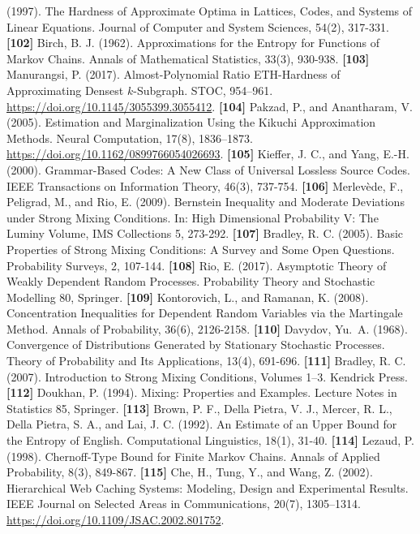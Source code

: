 \documentclass[
]{article}
\begin{document}
(1997). The Hardness of Approximate Optima in Lattices, Codes, and
Systems of Linear Equations. Journal of Computer and System Sciences,
54(2), 317-331.
\textbf{{[}102{]}} Birch, B. J. (1962). Approximations for the Entropy
for Functions of Markov Chains. Annals of Mathematical Statistics,
33(3), 930-938.
\textbf{{[}103{]}} Manurangsi, P.
(2017). Almost-Polynomial Ratio ETH-Hardness of Approximating Densest
$k$-Subgraph. STOC, 954--961. \url{https://doi.org/10.1145/3055399.3055412}.
\textbf{{[}104{]}} Pakzad, P., and Anantharam, V. (2005).
Estimation and Marginalization Using the Kikuchi Approximation Methods.
Neural Computation, 17(8), 1836--1873.
\url{https://doi.org/10.1162/0899766054026693}.
\textbf{{[}105{]}} Kieffer, J. C., and Yang, E.-H. (2000). Grammar-Based
Codes: A New Class of Universal Lossless Source Codes. IEEE Transactions
on Information Theory, 46(3), 737-754.
\textbf{{[}106{]}} Merlev\`ede, F., Peligrad, M., and Rio, E. (2009).
Bernstein Inequality and Moderate Deviations under Strong Mixing
Conditions. In: High Dimensional Probability V: The Luminy Volume,
IMS Collections 5, 273-292.
\textbf{{[}107{]}} Bradley, R. C. (2005). Basic Properties of Strong
Mixing Conditions: A Survey and Some Open Questions. Probability
Surveys, 2, 107-144.
\textbf{{[}108{]}} Rio, E. (2017). Asymptotic Theory of Weakly
Dependent Random Processes. Probability Theory and Stochastic
Modelling 80, Springer.
\textbf{{[}109{]}} Kontorovich, L., and Ramanan, K. (2008).
Concentration Inequalities for Dependent Random Variables via the
Martingale Method. Annals of Probability, 36(6), 2126-2158.
\textbf{{[}110{]}} Davydov, Yu.\ A. (1968). Convergence of
Distributions Generated by Stationary Stochastic Processes. Theory
of Probability and Its Applications, 13(4), 691-696.
\textbf{{[}111{]}} Bradley, R. C. (2007). Introduction to Strong
Mixing Conditions, Volumes 1--3. Kendrick Press.
\textbf{{[}112{]}} Doukhan, P. (1994). Mixing: Properties and
Examples. Lecture Notes in Statistics 85, Springer.
\textbf{{[}113{]}} Brown, P. F., Della Pietra, V. J., Mercer,
R. L., Della Pietra, S. A., and Lai, J. C. (1992). An Estimate of
an Upper Bound for the Entropy of English. Computational Linguistics,
18(1), 31-40.
\textbf{{[}114{]}} Lezaud, P. (1998). Chernoff-Type Bound for Finite
Markov Chains. Annals of Applied Probability, 8(3), 849-867.
\textbf{{[}115{]}} Che, H., Tung, Y., and Wang,
Z. (2002). Hierarchical Web Caching Systems: Modeling, Design and
Experimental Results. IEEE Journal on Selected Areas in Communications,
20(7), 1305--1314. \url{https://doi.org/10.1109/JSAC.2002.801752}.
\end{document}
